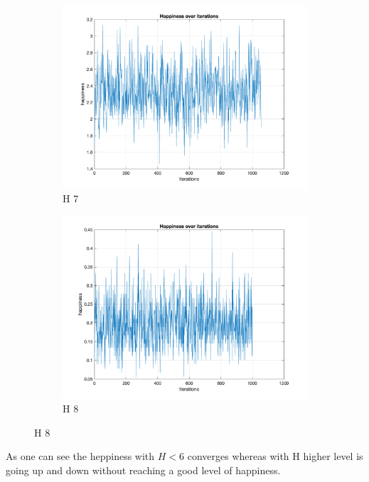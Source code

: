 \documentclass[unicode,11pt,a4paper,oneside,numbers=endperiod,openany]{scrartcl}
\begin{document}
\begin{figure}[H]
\begin{subfigure}[b]{0.45\textwidth}
        \includegraphics[width=\textwidth]{Convergence/ConvergenceH7Random_1.png}
        \caption{H 7}
        \label{fig:image16}
      \end{subfigure}
      \begin{subfigure}[b]{0.45\textwidth}
        \includegraphics[width=\textwidth]{Convergence/ConvergenceH8Random_1.png}
        \caption{H 8}
        \label{fig:image17}
      \end{subfigure}
      
      
\end{figure}
As one can see the heppiness with $H<6$ 
converges whereas with H higher level is 
going up and down without reaching a good level of happiness. \\
\end{document}
